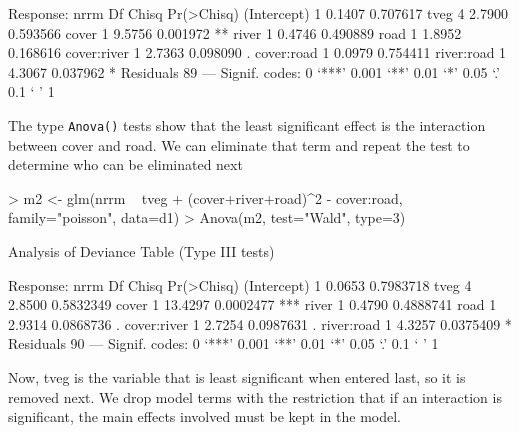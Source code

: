 \documentclass{article}
\begin{document}
\begin{Schunk}
\begin{Soutput}
Response: nrrm
            Df  Chisq Pr(>Chisq)   
(Intercept)  1 0.1407   0.707617   
tveg         4 2.7900   0.593566   
cover        1 9.5756   0.001972 **
river        1 0.4746   0.490889   
road         1 1.8952   0.168616   
cover:river  1 2.7363   0.098090 . 
cover:road   1 0.0979   0.754411   
river:road   1 4.3067   0.037962 * 
Residuals   89                     
---
Signif. codes:  0 ‘***’ 0.001 ‘**’ 0.01 ‘*’ 0.05 ‘.’ 0.1 ‘ ’ 1
\end{Soutput}
\end{Schunk}

The type \verb!Anova()! tests show that the least significant effect is the interaction between cover and road. We can eliminate that term and repeat the test to determine who can be eliminated next

\begin{Schunk}
\begin{Sinput}
> m2 <- glm(nrrm ~ tveg + (cover+river+road)^2 - cover:road, family="poisson", data=d1)
> Anova(m2, test="Wald", type=3)
\end{Sinput}
\begin{Soutput}
Analysis of Deviance Table (Type III tests)

Response: nrrm
            Df   Chisq Pr(>Chisq)    
(Intercept)  1  0.0653  0.7983718    
tveg         4  2.8500  0.5832349    
cover        1 13.4297  0.0002477 ***
river        1  0.4790  0.4888741    
road         1  2.9314  0.0868736 .  
cover:river  1  2.7254  0.0987631 .  
river:road   1  4.3257  0.0375409 *  
Residuals   90                       
---
Signif. codes:  0 ‘***’ 0.001 ‘**’ 0.01 ‘*’ 0.05 ‘.’ 0.1 ‘ ’ 1
\end{Soutput}
\end{Schunk}

Now, tveg is the variable that is least significant when entered last, so it is removed next. We drop model terms with the restriction that if an interaction is significant, the main effects involved must be kept in the model.
\end{document}
